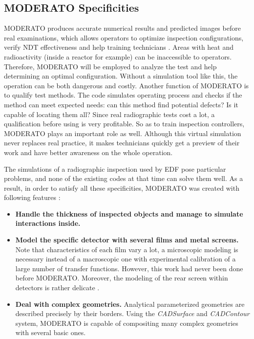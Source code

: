 
\subsection{MODERATO Specificities}
MODERATO produces accurate numerical results and predicted images before real examinations, which allows operators to optimize inspection configurations, verify NDT effectiveness and help training technicians \citep{Reference10}. Areas with heat and radioactivity (inside a reactor for example) can be inaccessible to operators. Therefore, MODERATO will be employed to analyze the test and help determining an optimal configuration. Without a simulation tool like this, the operation can be both dangerous and costly. Another function of MODERATO is to qualify test methods. The code simulates operating process and checks if the method can meet expected needs: can this method find potential defects? Is it capable of locating them all? Since real radiographic tests cost a lot, a qualification before using is very profitable. So as to train inspection controllers, MODERATO plays an important role as well. Although this virtual simulation never replaces real practice, it makes technicians quickly get a preview of their work and have better awareness on the whole operation.

The simulations of a radiographic inspection used by EDF pose particular problems, and none of the existing codes at that time can solve them well. As a result, in order to satisfy all these specificities, MODERATO was created with following features \citep{Reference10}:
\begin{itemize}
  \it
  \item \textbf{Handle the thickness of inspected objects and manage to simulate interactions inside.}
  \item \textbf{Model the specific detector with several films and metal screens.} Note that characteristics of each film vary a lot, a microscopic modeling is necessary instead of a macroscopic one with experimental calibration of a large number of transfer functions. However, this work had never been done before MODERATO. Moreover, the modeling of the rear screen within detectors is rather delicate \citep{Reference10}.
  \item \textbf{Deal with complex geometries.} Analytical parameterized geometries are described precisely by their borders. Using the \textit{CADSurface} and \textit{CADContour} system, MODERATO is capable of compositing many complex geometries with several basic ones.
\end{itemize}


